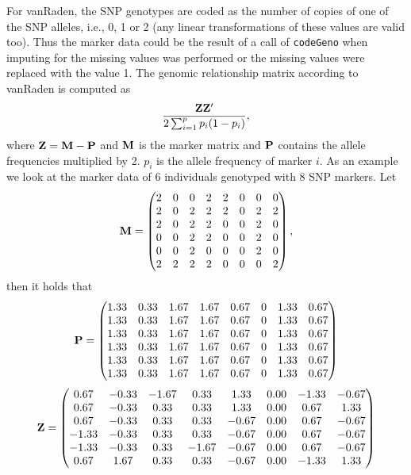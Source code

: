 \documentclass[a4paper,11pt]{article}
\begin{document}
For vanRaden, the SNP genotypes are coded as the number of copies of one of the SNP alleles, i.e., 0, 1 or 2 (any linear transformations of these values are valid too). Thus the marker data could be the result of a call of \texttt{codeGeno} when imputing for the missing values was performed or the missing values were replaced with the value 1.
The genomic relationship matrix according to vanRaden is computed as
\begin{equation}
\frac{\bf{Z}\bf{Z}'}{2\sum_{i=1}^p p_i(1-p_i)},
\end{equation}
where $\bf{Z}=\bf{M}-\bf{P}$ and $\bf{M}$ is the marker matrix and $\bf{P}$ contains the allele frequencies multiplied by 2. $p_i$ is the allele frequency of marker $i$.  As an example we look at the marker data of 6 individuals genotyped with 8 SNP markers. Let
$$ \bf M = \begin{pmatrix}  2 & 0 & 0 & 2 & 2 & 0 & 0 & 0 \\ 
   2 & 0 & 2 & 2 & 2 & 0 & 2 & 2 \\ 
   2 & 0 & 2 & 2 & 0 & 0 & 2 & 0 \\ 
   0 & 0 & 2 & 2 & 0 & 0 & 2 & 0 \\ 
   0 & 0 & 2 & 0 & 0 & 0 & 2 & 0 \\ 
   2 & 2 & 2 & 2 & 0 & 0 & 0 & 2 \\  
   \end{pmatrix}, $$
then it holds that
$$ \bf P = \begin{pmatrix}  1.33 & 0.33 & 1.67 & 1.67  & 0.67 & 0 &  1.33&  0.67 \\ 
   1.33 & 0.33 & 1.67 & 1.67  & 0.67 & 0 &  1.33&  0.67 \\ 
   1.33 & 0.33 & 1.67 & 1.67  & 0.67 & 0 &  1.33&  0.67 \\  
   1.33 & 0.33 & 1.67 & 1.67  & 0.67 & 0 &  1.33&  0.67 \\ 
   1.33 & 0.33 & 1.67 & 1.67  & 0.67 & 0 &  1.33&  0.67 \\  
   1.33 & 0.33 & 1.67 & 1.67  & 0.67 & 0 &  1.33&  0.67 \\   
   \end{pmatrix} $$
 $$    \bf Z = \begin{pmatrix}   0.67 & -0.33 & -1.67 & 0.33 & 1.33 & 0.00 & -1.33 & -0.67 \\ 
  0.67 & -0.33 & 0.33 & 0.33 & 1.33 & 0.00 & 0.67 & 1.33 \\ 
   0.67 & -0.33 & 0.33 & 0.33 & -0.67 & 0.00 & 0.67 & -0.67 \\ 
  -1.33 & -0.33 & 0.33 & 0.33 & -0.67 & 0.00 & 0.67 & -0.67 \\ 
   -1.33 & -0.33 & 0.33 & -1.67 & -0.67 & 0.00 & 0.67 & -0.67 \\ 
   0.67 & 1.67 & 0.33 & 0.33 & -0.67 & 0.00 & -1.33 & 1.33 \\ 
   \end{pmatrix}
  $$  
\end{document}
